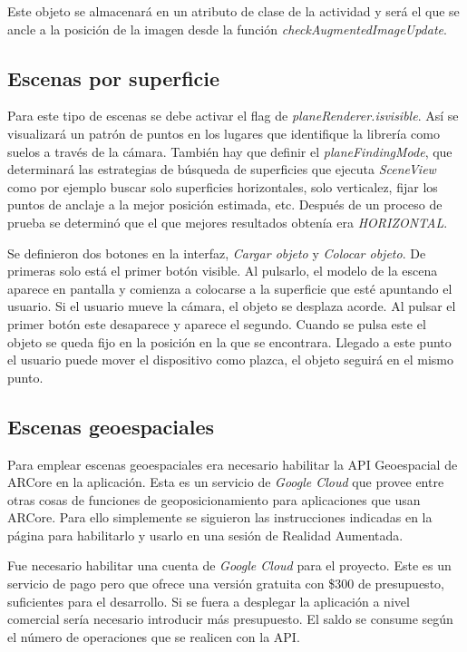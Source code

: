 Este objeto se almacenará en un atributo de clase de la actividad y será el que se ancle a la posición de la imagen desde la función \textit{checkAugmentedImageUpdate}.

\subsection{Escenas por superficie}

Para este tipo de escenas se debe activar el flag de \textit{planeRenderer.isvisible}. Así se visualizará un patrón de puntos en los lugares que identifique la librería como suelos a través de la cámara. También hay que definir el \textit{planeFindingMode}, que determinará las estrategias de búsqueda de superficies que ejecuta \textit{SceneView} como por ejemplo buscar solo superficies horizontales, solo verticalez, fijar los puntos de anclaje a la mejor posición estimada, etc. Después de un proceso de prueba se determinó que el que mejores resultados obtenía era \textit{HORIZONTAL}.


Se definieron dos botones en la interfaz, \textit{Cargar objeto} y \textit{Colocar objeto}. De primeras solo está el primer botón visible. Al pulsarlo, el modelo de la escena aparece en pantalla y comienza a colocarse a la superficie que esté apuntando el usuario. Si el usuario mueve la cámara, el objeto se desplaza acorde. Al pulsar el primer botón este desaparece y aparece el segundo. Cuando se pulsa este el objeto se queda fijo en la posición en la que se encontrara. Llegado a este punto el usuario puede mover el dispositivo como plazca, el objeto seguirá en el mismo punto.


\subsection{Escenas geoespaciales}

Para emplear escenas geoespaciales era necesario habilitar la API Geoespacial\cite{geospatialapi} de ARCore en la aplicación. Esta es un servicio de \textit{Google Cloud} que provee entre otras cosas de funciones de geoposicionamiento para aplicaciones que usan ARCore. Para ello simplemente se siguieron las instrucciones indicadas en la página para habilitarlo y usarlo en una sesión de Realidad Aumentada.

Fue necesario habilitar una cuenta de \textit{Google Cloud} para el proyecto. Este es un servicio de pago pero que ofrece una versión gratuita con \$300 de presupuesto, suficientes para el desarrollo. Si se fuera a desplegar la aplicación a nivel comercial sería necesario introducir más presupuesto. El saldo se consume según el número de operaciones que se realicen con la API.

